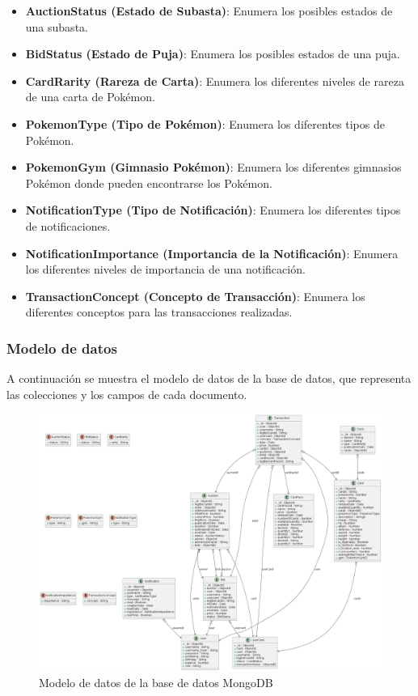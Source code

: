 \begin{itemize}
    \item \textbf{AuctionStatus (Estado de Subasta)}: Enumera los posibles estados de una subasta.

    \item \textbf{BidStatus (Estado de Puja)}: Enumera los posibles estados de una puja.

    \item \textbf{CardRarity (Rareza de Carta)}: Enumera los diferentes niveles de rareza de una carta de Pokémon.

    \item \textbf{PokemonType (Tipo de Pokémon)}: Enumera los diferentes tipos de Pokémon.

    \item \textbf{PokemonGym (Gimnasio Pokémon)}: Enumera los diferentes gimnasios Pokémon donde pueden encontrarse los Pokémon.

    \item \textbf{NotificationType (Tipo de Notificación)}: Enumera los diferentes tipos de notificaciones.

    \item \textbf{NotificationImportance (Importancia de la Notificación)}: Enumera los diferentes niveles de importancia de una notificación.

    \item \textbf{TransactionConcept (Concepto de Transacción)}: Enumera los diferentes conceptos para las transacciones realizadas.
\end{itemize}


\subsubsection{Modelo de datos}
A continuación se muestra el modelo de datos de la base de datos, que representa las colecciones y los campos de cada documento.

\begin{figure}[H]
    \centering
    \includegraphics[width=1\textwidth]{figures/6-Analisis/6_9_mongodb_model.png}
    \caption{Modelo de datos de la base de datos MongoDB}
    \label{fig:mongodb_model}
\end{figure}

